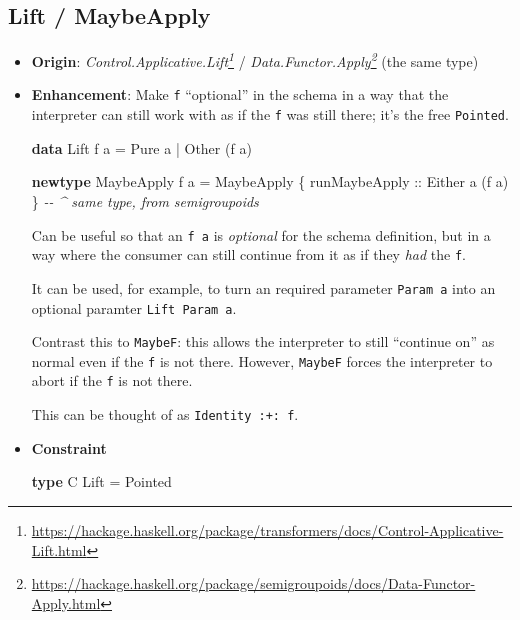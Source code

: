 \documentclass[]{article}
\newenvironment{Shaded}{}{}
\newcommand{\CommentTok}[1]{\textcolor[rgb]{0.38,0.63,0.69}{\textit{#1}}}
\newcommand{\DataTypeTok}[1]{\textcolor[rgb]{0.56,0.13,0.00}{#1}}
\newcommand{\KeywordTok}[1]{\textcolor[rgb]{0.00,0.44,0.13}{\textbf{#1}}}
\newcommand{\NormalTok}[1]{#1}
\newcommand{\OperatorTok}[1]{\textcolor[rgb]{0.40,0.40,0.40}{#1}}
\newcommand{\OtherTok}[1]{\textcolor[rgb]{0.00,0.44,0.13}{#1}}
\renewcommand{\href}[2]{#2\footnote{\url{#1}}}
\begin{document}
\hypertarget{lift-maybeapply}{%
\subsection{Lift / MaybeApply}\label{lift-maybeapply}}

\begin{itemize}
\item
  \textbf{Origin}:
  \emph{\href{https://hackage.haskell.org/package/transformers/docs/Control-Applicative-Lift.html}{Control.Applicative.Lift}}
  /
  \emph{\href{https://hackage.haskell.org/package/semigroupoids/docs/Data-Functor-Apply.html}{Data.Functor.Apply}}
  (the same type)
\item
  \textbf{Enhancement}: Make \texttt{f} ``optional'' in the schema in a way that
  the interpreter can still work with as if the \texttt{f} was still there; it's
  the free \texttt{Pointed}.

\begin{Shaded}
\begin{Highlighting}[]
\KeywordTok{data} \DataTypeTok{Lift}\NormalTok{ f a }\OtherTok{=} \DataTypeTok{Pure}\NormalTok{  a}
              \OperatorTok{|} \DataTypeTok{Other}\NormalTok{ (f a)}

\KeywordTok{newtype} \DataTypeTok{MaybeApply}\NormalTok{ f a }\OtherTok{=} \DataTypeTok{MaybeApply}\NormalTok{ \{}\OtherTok{ runMaybeApply ::} \DataTypeTok{Either}\NormalTok{ a (f a) \}}
    \CommentTok{{-}{-} \^{} same type, from semigroupoids}
\end{Highlighting}
\end{Shaded}

  Can be useful so that an \texttt{f\ a} is \emph{optional} for the schema
  definition, but in a way where the consumer can still continue from it as if
  they \emph{had} the \texttt{f}.

  It can be used, for example, to turn an required parameter \texttt{Param\ a}
  into an optional paramter \texttt{Lift\ Param\ a}.

  Contrast this to \texttt{MaybeF}: this allows the interpreter to still
  ``continue on'' as normal even if the \texttt{f} is not there. However,
  \texttt{MaybeF} forces the interpreter to abort if the \texttt{f} is not
  there.

  This can be thought of as \texttt{Identity\ :+:\ f}.
\item
  \textbf{Constraint}

\begin{Shaded}
\begin{Highlighting}[]
\KeywordTok{type} \DataTypeTok{C} \DataTypeTok{Lift} \OtherTok{=} \DataTypeTok{Pointed}


\end{Highlighting}
\end{Shaded}
\end{itemize}
\end{document}
